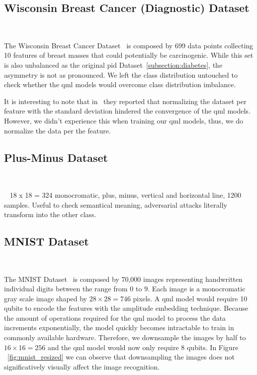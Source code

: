 \subsection{Wisconsin Breast Cancer (Diagnostic) Dataset} \

The Wisconsin Breast Cancer Dataset~\cite{street_nuclear_1993} is
composed by 699 data points collecting 10 features of breast masses
that could potentially be carcinogenic. While this set is also
unbalanced as the original \ac{pid} Dataset~\ref{subsection:diabetes},
the asymmetry is not as pronounced. We left the class distribution
untouched to check whether the \ac{qml} models would overcome class
distribution imbalance. \

It is interesting to note that in~\cite{winderl_quantum_2023}
they reported that normalizing the dataset per feature with the
standard deviation hindered the convergence of the \ac{qml} models.
However, we didn't experience this when training our \ac{qml} models,
thus, we do normalize the data per the feature. \

\subsection{Plus-Minus Dataset} \

~\cite{wendlinger_comparative_2024} 18 x 18 = 324 monocromatic, plus,
minus, vertical and horizontal line, 1200 samples. Useful to check
semantical meaning, adversarial attacks literally transform into the
other class. \

\subsection{MNIST Dataset} \

The MNIST Dataset~\cite{bottou_comparison_1994} is composed by
70,000 images representing handwritten individual digits between
the range from \(0\) to \(9\). Each image is a monocromatic gray scale
image shaped by \(28 \times 28 = 746\) pixels. A \ac{qml} model would
require 10 qubits to encode the features with the amplitude embedding
technique. Because the amount of operations required for the
\ac{qml} model to process the data increments exponentially, the model
quickly becomes intractable to train in commonly available hardware.
Therefore, we downsample the images by half to \(16 \times 16 = 256\) and
the \ac{qml} model would now only require 8 qubits. In Figure
~\ref{fig:mnist_resized} we can observe that downsampling the images
does not significatively visually affect the image recognition. \

